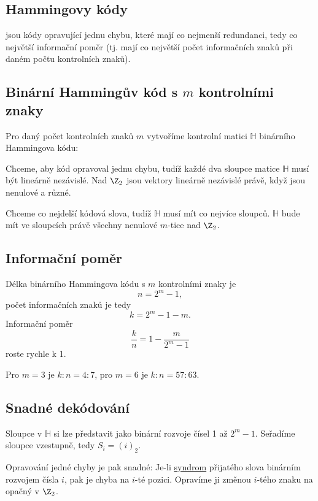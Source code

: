 \subsection{Hammingovy kódy}
 jsou kódy opravující jednu chybu, které mají co nejmenší redundanci, tedy co největší informační poměr (tj. mají co největší počet informačních znaků při daném počtu kontrolních znaků).

\subsection{Binární Hammingův kód s \texorpdfstring{$m$}{m} kontrolními znaky}
Pro daný počet kontrolních znaků $m$ vytvoříme kontrolní matici $\mathbb{H}$ binárního Hammingova kódu:

Chceme, aby kód opravoval jednu chybu, tudíž každé dva sloupce matice $\mathbb{H}$ musí být lineárně nezávislé. Nad $\Z_2$ jsou vektory lineárně nezávislé právě, když jsou nenulové a různé.

Chceme co nejdelší kódová slova, tudíž $\mathbb{H}$ musí mít co nejvíce sloupců. $\mathbb{H}$ bude mít ve sloupcích právě všechny nenulové $m$-tice nad $\Z_2$. 

\subsection{Informační poměr}
Délka binárního Hammingova kódu s $m$ kontrolními znaky je
\begin{equation}
	n = 2^m - 1,
\end{equation}
počet informačních znaků je tedy
\begin{equation}
	k = 2^m - 1 -m.
\end{equation}
Informační poměr
\begin{equation}
	\frac{k}{n} = 1 - \frac{m}{2^m -1}
\end{equation}
roste rychle k 1.

Pro $m = 3$ je $k:n = 4:7$, pro $m=6$ je $k:n = 57:63$.

\subsection{Snadné dekódování}
Sloupce v $\mathbb{H}$ si lze představit jako binární rozvoje čísel 1 až $2^m - 1$. Seřadíme sloupce vzestupně, tedy $S_i = (i)_2$.

Opravování jedné chyby je pak snadné: Je-li \hyperref[syndrom]{syndrom} přijatého slova binárním rozvojem čísla $i$, pak je chyba na $i$-té pozici. Opravíme ji změnou $i$-tého znaku na opačný v $\Z_2$.

